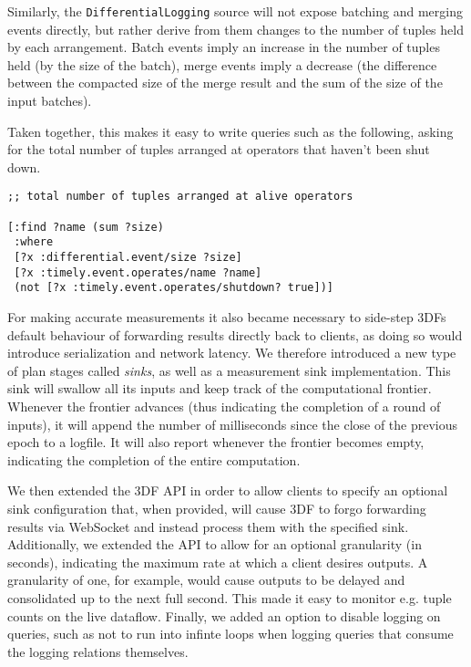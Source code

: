 \documentclass[../index.tex]{subfiles}
\begin{document}
Similarly, the \texttt{DifferentialLogging} source will not expose
batching and merging events directly, but rather derive from them
changes to the number of tuples held by each arrangement. Batch events
imply an increase in the number of tuples held (by the size of the
batch), merge events imply a decrease (the difference between the
compacted size of the merge result and the sum of the size of the
input batches).

Taken together, this makes it easy to write queries such as the
following, asking for the total number of tuples arranged at operators
that haven't been shut down.

\begin{lstlisting}[language=datalog, style=colorlog]
;; total number of tuples arranged at alive operators

[:find ?name (sum ?size)
 :where
 [?x :differential.event/size ?size]
 [?x :timely.event.operates/name ?name]  
 (not [?x :timely.event.operates/shutdown? true])]
\end{lstlisting}

For making accurate measurements it also became necessary to side-step
3DFs default behaviour of forwarding results directly back to clients,
as doing so would introduce serialization and network latency. We
therefore introduced a new type of plan stages called \emph{sinks}, as
well as a measurement sink implementation. This sink will swallow all
its inputs and keep track of the computational frontier. Whenever the
frontier advances (thus indicating the completion of a round of
inputs), it will append the number of milliseconds since the close of
the previous epoch to a logfile. It will also report whenever the
frontier becomes empty, indicating the completion of the entire
computation.

We then extended the 3DF API in order to allow clients to specify an
optional sink configuration that, when provided, will cause 3DF to
forgo forwarding results via WebSocket and instead process them with
the specified sink. Additionally, we extended the API to allow for an
optional granularity (in seconds), indicating the maximum rate at
which a client desires outputs. A granularity of one, for example,
would cause outputs to be delayed and consolidated up to the next full
second. This made it easy to monitor e.g. tuple counts on the live
dataflow. Finally, we added an option to disable logging on queries,
such as not to run into infinte loops when logging queries that
consume the logging relations themselves.
\end{document}
